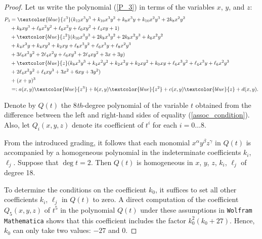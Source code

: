 \documentclass[14pt, dvipsnames]{extarticle}
\theoremstyle{definition}
\theoremstyle{definition}
\theoremstyle{remark}
\begin{document}
\begin{proof}

Let us write the polynomial (\ref{P_3}) in terms of the variables $x$, $y$, and $z$:
$$\begin{aligned}P_3 &= \textcolor{blue}{z^3} (k_{12} x^3 y^3+k_{10} x^3 y^2+k_8 x^3 y+k_{10} x^2 y^3+2 k_8 x^2 y^2 \\ &+ k_8 x y^3+\ell_8 x^2 y^2+\ell_6 x^2 y+\ell_6 x y^2+\ell_4 x y+1) \\ &+ \textcolor{blue}{z^2} (k_{10} x^3 y^3+2 k_8 x^3 y^2+2 k_8 x^2 y^3+k_6 x^2 y^2 \\ &+ k_4 x^2 y+k_4 x y^2+k_2 x y+\ell_8 x^3 y^2+\ell_6 x^3 y+\ell_8 x^2 y^3 \\ &+ 3 \ell_6 x^2 y^2+2 \ell_4 x^2 y+\ell_6 x y^3+2 \ell_4 x y^2+3 x+3 y) \\ &+ \textcolor{blue}{z} (k_8 x^3 y^3+k_4 x^2 y^2+k_2 x^2 y+k_2 x y^2+k_0 x y+\ell_6 x^3 y^2+\ell_4 x^3 y+\ell_6 x^2 y^3 \\ &+ 2 \ell_4 x^2 y^2+\ell_4 x y^3+3 x^2+6 x y+3 y^2) \\ &+ (x + y)^3 \\ &=: a(x, y)\textcolor{blue}{z^3} + b(x, y)\textcolor{blue}{z^2} + c(x, y)\textcolor{blue}{z} + d(x, y).\end{aligned}$$


Denote by $Q(t)$ the 8\textit{th}-degree polynomial of the variable $t$ obtained from the difference between the left and right-hand sides of equality (\ref{assoc_condition}). Also, let $Q_i(x, y, z)$ denote its coefficient of $t^i$ for each $i = 0\dots 8$.

From the introduced grading, it follows that each monomial $x^\alpha y^\beta z^\gamma$ in $Q(t)$ is accompanied by a homogeneous polynomial in the indeterminate coefficients $k_i$, $\ell_j$. Suppose that $\deg t = 2$. Then $Q(t)$ is homogeneous in $x$, $y$, $z$, $k_i$, $\ell_j$ of degree 18. 

To determine the conditions on the coefficient $k_0$, it suffices to set all other coefficients $k_i$, $\ell_j$ in $Q(t)$ to zero. A direct computation of the coefficient $Q_5(x, y, z)$ of $t^5$ in the polynomial $Q(t)$ under these assumptions in {\tt Wolfram Mathematica} shows that this coefficient includes the factor $k_0^2 \left(k_0+27\right)$. Hence, $k_0$ can only take two values: $-27$ and $0$.


\end{proof}
\end{document}
